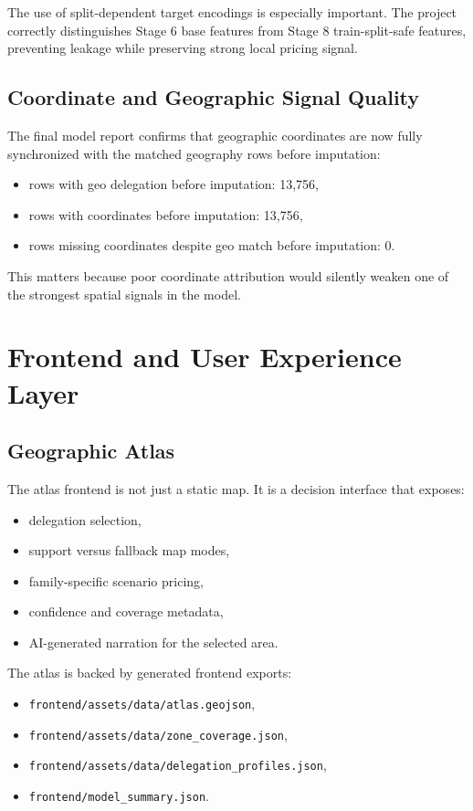 \documentclass[11pt,a4paper]{article}
\newcommand{\code}[1]{\texttt{#1}}
\begin{document}
The use of split-dependent target encodings is especially important. The project correctly distinguishes Stage 6 base features from Stage 8 train-split-safe features, preventing leakage while preserving strong local pricing signal.

\subsection{Coordinate and Geographic Signal Quality}

The final model report confirms that geographic coordinates are now fully synchronized with the matched geography rows before imputation:

\begin{itemize}
\item rows with geo delegation before imputation: 13,756,
\item rows with coordinates before imputation: 13,756,
\item rows missing coordinates despite geo match before imputation: 0.
\end{itemize}

This matters because poor coordinate attribution would silently weaken one of the strongest spatial signals in the model.

\section{Frontend and User Experience Layer}

\subsection{Geographic Atlas}

The atlas frontend is not just a static map. It is a decision interface that exposes:

\begin{itemize}
\item delegation selection,
\item support versus fallback map modes,
\item family-specific scenario pricing,
\item confidence and coverage metadata,
\item AI-generated narration for the selected area.
\end{itemize}

The atlas is backed by generated frontend exports:

\begin{itemize}
\item \code{frontend/assets/data/atlas.geojson},
\item \code{frontend/assets/data/zone\_coverage.json},
\item \code{frontend/assets/data/delegation\_profiles.json},
\item \code{frontend/model\_summary.json}.
\end{itemize}
\end{document}
